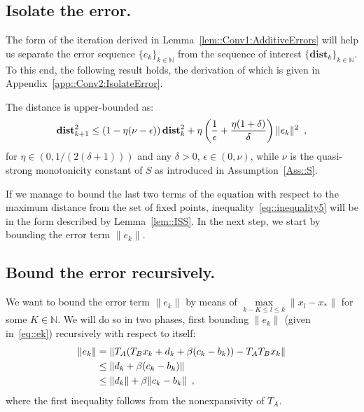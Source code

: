 \documentclass[envcountsect]{svjour3}
\newcommand{\N}{{\mathbb{N} }}
\newcommand{\dist}{{\mathbf{dist} }}
\begin{document}
\subsection{Isolate the error. }
The form of the iteration derived in Lemma~\ref{lem::Conv1:AdditiveErrors} will help us separate the error
sequence $\{e_k\}_{k\in\mathbb{N}}$ from the sequence of interest $\{\dist_k\}_{k\in\mathbb{N}}$. To this end, the following result holds, the
derivation of which is given in Appendix~\ref{app::Conv2:IsolateError}.
\begin{lemma}\label{lem::Conv2:IsolateError}
The distance is upper-bounded as:
\begin{equation}{\label{eq::inequality5}}
 \dist_{k+1}^2\leq\left(1-\eta(\nu-\epsilon)\right)\dist_k^2 + \eta\left(\frac{1}{\epsilon}+\frac{\eta(1+\delta)}{\delta}\right)\|e_k\|^2
                                   \enspace,
\end{equation}
for $\eta\in(0, 1/(2(\delta+1)))$ and any $\delta>0$, $\epsilon\in(0,\nu)$, while $\nu$ is the quasi-strong monotonicity constant of $S$ as introduced in Assumption~\ref{Ass::S}.
\end{lemma}
If we manage to bound the last two terms of the equation with
respect to the maximum distance from the set of fixed points, inequality~\eqref{eq::inequality5} will be in the form described by
Lemma~\ref{lem::ISS}. In the next step, we start by bounding the error term $\|e_k\|$.


\subsection{Bound the error recursively. }
We want to bound the error term $\|e_k\|$ by means of $\underset{k-K\leq l\leq k}{\max}\|x_l-x_\ast\|$ for
some $K\in\N$.
We will do so in two phases, first bounding $\|e_k\|$ (given in~\eqref{eq::ek}) recursively with respect to
itself:
\begin{align}{\label{eq::boundek}}
 \|e_k\| \nonumber &= \|T_A(T_Bx_k+d_k+\beta(c_k-b_k))-T_AT_Bx_k\|\\\nonumber
         &\leq \|d_k+\beta(c_k-b_k)\|\\
         &\leq \|d_k\| + \beta\|c_k-b_k\|\enspace,
\end{align}
where the first inequality follows from the nonexpansivity of $T_A$.
\end{document}
